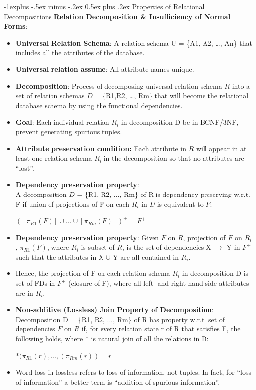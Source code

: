 \documentclass[12pt, landscape]{article}
\makeatletter
\renewcommand{\subsection}{\@startsection{subsection}{2}{0.1mm}%
                                {-1explus -.5ex minus -.2ex}%
                                {0.5ex plus .2ex}%
                                {\normalfont\normalsize\bfseries}}
\makeatother
\begin{document}
\begin{multicols*}{3}
\subsection{Properties of Relational Decompositions}
\textbf{Relation Decomposition \& Insufficiency of Normal Forms}: 
\begin{itemize}
\item \textbf{Universal Relation Schema}: A relation schema U = \{A1, A2, …, An\} that includes all the attributes of the database.
\item \textbf{Universal relation assume}: All attribute names unique.
\item \textbf{Decomposition}: Process of decomposing universal relation 
schema $R$ into a set of relation schemas $D$ = \{R1,R2, …, Rm\} that will become the relational database schema by using the functional dependencies.
\item \textbf{Goal}: Each individual relation $R_i$ in decomposition D be in BCNF/3NF, prevent generating spurious tuples.
\item \textbf{Attribute preservation condition:} Each attribute in $R$ will appear in at least one relation schema $R_i$ in the decomposition so that no attributes are “lost”.
\item \textbf{Dependency preservation property}: \\
A decomposition $D$ = \{R1, R2, ..., Rm\} of R is dependency-preserving w.r.t. F if union of projections of F on each $R_i$ in $D$ is equivalent to $F$: \\
\centerline{
$ ([\pi_{R1}(F)] \cup ... \cup  [\pi_{Rm}(F)])^+ = F^+$
}


\item \textbf{Dependency preservation property}: Given $F$ on $R$, projection of $F$ on $R_i$, $\pi_{R1}(F)$, where $R_i$ is subset of $R$, is the set of dependencies X $\rightarrow$ Y in $F^+$ such that the attributes 
in X $\cup$ Y are all contained in $R_i$.
\item Hence, the projection of F on each relation schema $R_i$ in decomposition D is set of FDs in $F^+$ (closure of F), where all left- and right-hand-side attributes are in $R_i$.
\medskip

\item \textbf{Non-additive (Lossless) Join Property of Decomposition}: \\
Decomposition D = \{R1, R2, ..., Rm\} of R has property
w.r.t. set of dependencies $F$ on $R$ if, for every relation state r of R that satisfies F, the following holds, where * is natural join of all the relations in D: 
\centerline{$*(\pi_{R1}(r), ..., (\pi_{Rm}(r)) = r $}
\item Word loss in lossless refers to loss of information, not tuples. In fact, for “loss of information” a better term is “addition of spurious information''.
\end{itemize}


\end{multicols*}
\end{document}
